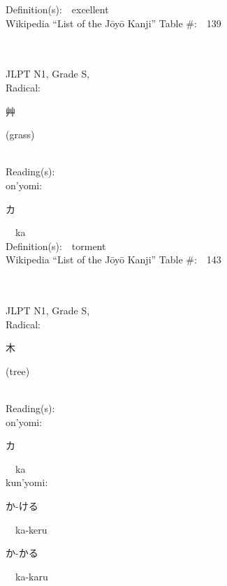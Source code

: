 \begin{multicols}{2}
Definition(s):\ \ excellent \\
Wikipedia ``List of the J\=oy\=o Kanji'' Table \#:\ \ 139 \\
\ \ \\
{\fontsize{34pt}{40pt}  }\ \ \\
{JLPT N1, Grade S, \\Radical:\ \ {\begin{CJK}{UTF8}{min} 艸 \end{CJK}} (grass) } \\
Reading(s):\ \ \\
{\hspace*{1em}}on'yomi:\ \ \\
{\hspace*{2em}}{\begin{CJK}{UTF8}{min} カ \end{CJK}}\ \ ka\ \ \\
Definition(s):\ \ torment \\
Wikipedia ``List of the J\=oy\=o Kanji'' Table \#:\ \ 143 \\
\ \ \\
{\fontsize{34pt}{40pt}  }\ \ \\
{JLPT N1, Grade S, \\Radical:\ \ {\begin{CJK}{UTF8}{min} 木 \end{CJK}} (tree) } \\
Reading(s):\ \ \\
{\hspace*{1em}}on'yomi:\ \ \\
{\hspace*{2em}}{\begin{CJK}{UTF8}{min} カ \end{CJK}}\ \ ka\ \ \\
{\hspace*{1em}}kun'yomi:\ \ \\
{\hspace*{2em}}{\begin{CJK}{UTF8}{min} か-ける \end{CJK}}\ \ ka-keru\ \ \\
{\hspace*{2em}}{\begin{CJK}{UTF8}{min} か-かる \end{CJK}}\ \ ka-karu\ \ \\

\end{multicols}
